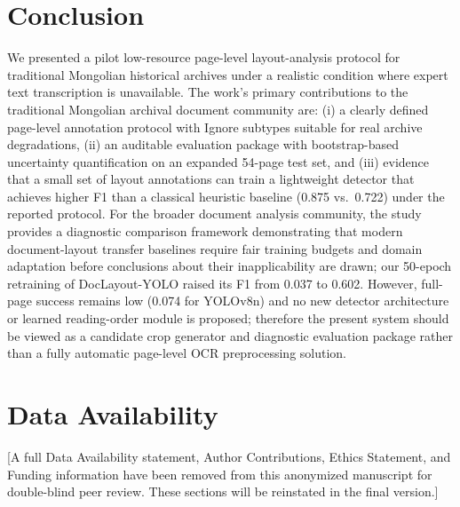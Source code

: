 \documentclass[12pt]{article}
\begin{document}
\section{Conclusion}
We presented a pilot low-resource page-level layout-analysis protocol for traditional Mongolian historical archives under a realistic condition where expert text transcription is unavailable. The work's primary contributions to the traditional Mongolian archival document community are: (i) a clearly defined page-level annotation protocol with Ignore subtypes suitable for real archive degradations, (ii) an auditable evaluation package with bootstrap-based uncertainty quantification on an expanded 54-page test set, and (iii) evidence that a small set of layout annotations can train a lightweight detector that achieves higher F1 than a classical heuristic baseline (0.875 vs.~0.722) under the reported protocol. For the broader document analysis community, the study provides a diagnostic comparison framework demonstrating that modern document-layout transfer baselines require fair training budgets and domain adaptation before conclusions about their inapplicability are drawn; our 50-epoch retraining of DocLayout-YOLO raised its F1 from 0.037 to 0.602. However, full-page success remains low (0.074 for YOLOv8n) and no new detector architecture or learned reading-order module is proposed; therefore the present system should be viewed as a candidate crop generator and diagnostic evaluation package rather than a fully automatic page-level OCR preprocessing solution.


\section*{Data Availability}
[A full Data Availability statement, Author Contributions, Ethics Statement, and Funding information have been removed from this anonymized manuscript for double-blind peer review. These sections will be reinstated in the final version.]

\clearpage
\end{document}
